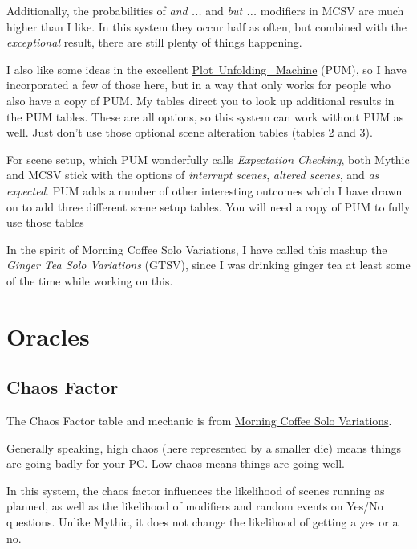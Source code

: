 Additionally, the probabilities of \emph{and ...} and \emph{but ...}
modifiers in MCSV are much higher than I like. In this system they occur half
as often, but combined with the \emph{exceptional} result, there are still
plenty of things happening.

I also like some ideas in the excellent
\href{https://jeansenvaars.itch.io/plot-unfolding-machine}{Plot~Unfolding~
Machine} (PUM), so I have incorporated a few of those here, but in a way that
only works for people who also have a copy of PUM. My tables direct you to look
up additional results in the PUM tables. These are all options, so this system
can work without PUM as well. Just don't use those optional scene alteration
tables (tables 2 and 3).

For scene setup, which PUM wonderfully calls \emph{Expectation Checking}, both
Mythic and MCSV stick with the options of \emph{interrupt scenes}, \emph{altered
scenes}, and \emph{as expected}. PUM adds a number of other interesting outcomes
which I have drawn on to add three different scene setup tables. You will need a
copy of PUM to fully use those tables

In the spirit of Morning Coffee Solo Variations, I have called this mashup the
\emph{Ginger Tea Solo Variations} (GTSV), since I was drinking ginger tea at
least some of the time while working on this.

\section{Oracles}
\subsection{Chaos Factor}
The Chaos Factor table and mechanic is from
\href{https://aleaiactandaest.blogspot.com/p/downloads.html}{Morning Coffee Solo
Variations}.

Generally speaking, high chaos (here represented by a smaller die) means things
are going badly for your PC. Low chaos means things are going well.

In this system, the chaos factor influences the likelihood of scenes running as
planned, as well as the likelihood of modifiers and random events on Yes/No
questions. Unlike Mythic, it does not change the likelihood of getting a yes or
a no.

